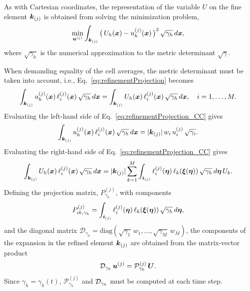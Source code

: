\documentclass[10pt]{article}
\begin{document}
As with Cartesian coordinates, the representation of the variable $U$ on the fine element
$\boldsymbol{k}_{\left(j\right)}$ is obtained from solving the minimization problem,
\begin{equation}
  \min_{\boldsymbol{u}^{(j)}}\int_{\boldsymbol{k}_{(j)}}\big(\,U_{h}(\boldsymbol{x})-u_{h}^{(j)}(\boldsymbol{x})\,\big)^{2}\,
  \sqrt{\gamma_{h}}\,d\boldsymbol{x},
\end{equation}
where $\sqrt{\gamma_{h}}$ is the numerical approximation to the metric determinant $\sqrt{\gamma}$.

When demanding equality of the cell averages, the metric determinant
must be taken into account, i.e., Eq.~\eqref{eq:refinementProjection} becomes
\begin{equation}
  \int_{\boldsymbol{k}_{(j)}}u_{h}^{(j)}(\boldsymbol{x})\,\ell_{i}^{(j)}(\boldsymbol{x})\,\sqrt{\gamma_{h}}\,d\boldsymbol{x}
  =\int_{\boldsymbol{k}_{(j)}}U_{h}(\boldsymbol{x})\,\ell_{i}^{(j)}(\boldsymbol{x})\,\sqrt{\gamma_{h}}\,d\boldsymbol{x},\quad i=1,\ldots,M.
  \label{eq:refinementProjection_CC}
\end{equation}
Evaluating the left-hand side of Eq.~\eqref{eq:refinementProjection_CC} gives
\begin{equation}
  \int_{\boldsymbol{k}_{(j)}}u_{h}^{(j)}(\boldsymbol{x})\,\ell_{i}^{(j)}(\boldsymbol{x})\,\sqrt{\gamma_{h}}\,d\boldsymbol{x}
  =|\boldsymbol{k}_{(j)}|\,w_{i}\,u_{i}^{(j)}\,\sqrt{\gamma_{i}}.
  \end{equation}
  Evaluating the right-hand side of Eq.~\eqref{eq:refinementProjection_CC} gives
  \begin{equation}
  \int_{\boldsymbol{k}_{(j)}}U_{h}(\boldsymbol{x})\,\ell_{i}^{(j)}(\boldsymbol{x})\,\sqrt{\gamma_{h}}\,d\boldsymbol{x}
  =|\boldsymbol{k}_{(j)}|\sum_{k=1}^{M}\int_{\boldsymbol{i}_{(j)}}\ell_{i}^{(j)}(\boldsymbol{\eta})\,\ell_{k}(\boldsymbol{\xi}(\boldsymbol{\eta}))\,\sqrt{\gamma_{h}}\,d\boldsymbol{\eta}\,U_{k}.
\end{equation}
Defining the projection matrix, $P^{\left(j\right)}_{\gamma_{h}}$, with components
\begin{equation}
P^{\left(j\right)}_{ik,\gamma_{h}}
=\int_{\boldsymbol{i}_{(j)}}\ell_{i}^{(j)}(\boldsymbol{\eta})\,\ell_{k}(\boldsymbol{\xi}(\boldsymbol{\eta}))\,\sqrt{\gamma_{h}}\,d\boldsymbol{\eta},
\end{equation}
and the diagonal matrix $\mathcal{D}_{\gamma_{h}}
=\mbox{diag}(\sqrt{\gamma_{1}}\,w_{1},\ldots,\sqrt{\gamma_{M}}\,w_{M})$, the components of the expansion in the refined element $\boldsymbol{k}_{(j)}$ are obtained from the matrix-vector product
\begin{equation}
  \mathcal{D}_{\gamma_{h}}\,\boldsymbol{u}^{(j)} = \mathcal{P}^{(j)}_{\gamma_{h}}\,\boldsymbol{U}.
\end{equation}
Since $\gamma_{h}=\gamma_{h}\left(t\right)$, $\mathcal{P}^{\left(j\right)}_{\gamma_{h}}$
and $\mathcal{D}_{\gamma_{h}}$
must be computed at each time step.
\end{document}
